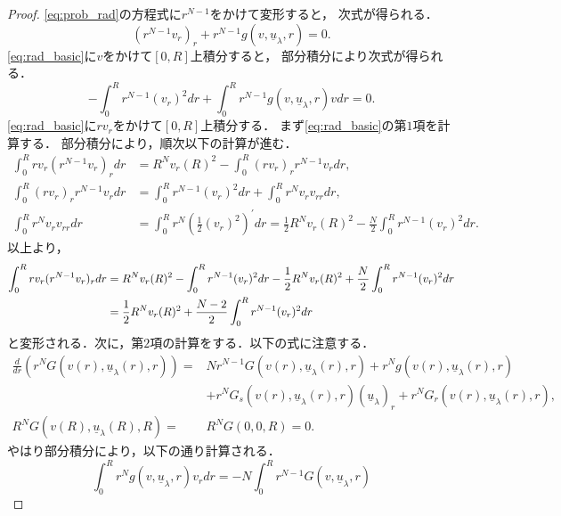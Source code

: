 \begin{proof}
 \eqref{eq:prob_rad}の方程式に$r^{N-1}$をかけて変形すると，
 次式が得られる．
 \begin{equation}
  (r^{N-1} v_r)_r + r^{N-1} g(v, \underline{u}_\lambda, r) = 0.
   \label{eq:rad_basic} 
 \end{equation}
 \eqref{eq:rad_basic}に$v$をかけて$[0, R]$上積分すると，
 部分積分により次式が得られる．
 \begin{equation}
  - \int_0^R r^{N-1} (v_r)^2 dr + \int_0^R r^{N-1} g(v,
   \underline{u}_\lambda, r) v dr = 0.  \label{eq:poh_times_v}
 \end{equation}
 \eqref{eq:rad_basic}に$rv_r$をかけて$[0, R]$上積分する．
 まず\eqref{eq:rad_basic}の第$1$項を計算する．
 部分積分により，順次以下の計算が進む．
 \begin{align*}
  \int_0^R r v_r (r^{N-1} v_r)_r dr &= R^N v_r(R)^2 - \int_0^R
  (rv_r)_r r^{N-1} v_r dr, \\
  \int_0^R (rv_r)_r r^{N-1} v_r dr &= \int_0^R r^{N-1} (v_r)^2 dr +
  \int_0^R r^N v_r v_{rr} dr, \\
  \int_0^R r^N v_r v_{rr} dr &= \int_0^R r^N \left( \frac{1}{2}
  (v_r)^2 \right)^\prime dr = \frac{1}{2} R^N v_r(R)^2 - \frac{N}{2}
  \int_0^R r^{N-1} (v_r)^2 dr.
 \end{align*}
 以上より，
 \begin{align}
  \int_0^R r v_r (r^{N-1} v_r)_r dr &= R^N v_r(R)^2 - 
  \int_0^R r^{N-1} (v_r)^2 dr - \frac{1}{2} R^N v_r(R)^2 + \frac{N}{2}
  \int_0^R r^{N-1} (v_r)^2 dr \notag \\ 
  &= \frac{1}{2} R^N v_r(R)^2 + \frac{N-2}{2}\int_0^R r^{N-1} (v_r)^2
  dr \label{eq:poh_times_rvr_1}
 \end{align}
 と変形される．次に，第$2$項の計算をする．以下の式に注意する．
 \begin{align*}
  \frac{d}{dr} \left( r^N G(v(r), \underline{u}_\lambda(r), r )
  \right) =& N r^{N-1} G( v(r), \underline{u}_\lambda(r), r) + r^N g(
  v(r), \underline{u}_\lambda(r), r) \\ &+ r^N G_s(v(r),
  \underline{u}_\lambda(r), r) (\underline{u}_\lambda)_r
  + r^N G_r(v(r), \underline{u}_\lambda(r),
  r), \\
  R^N G(v(R), \underline{u}_\lambda(R), R) =& R^N G(0, 0, R) = 0. 
 \end{align*}
 やはり部分積分により，以下の通り計算される．
 \begin{equation}
  \int_0^R r^N g(v, \underline{u}_\lambda, r) v_r dr
   = -N \int_0^R r^{N-1} G(v, \underline{u}_\lambda, r)

\end{equation}
\end{proof}
